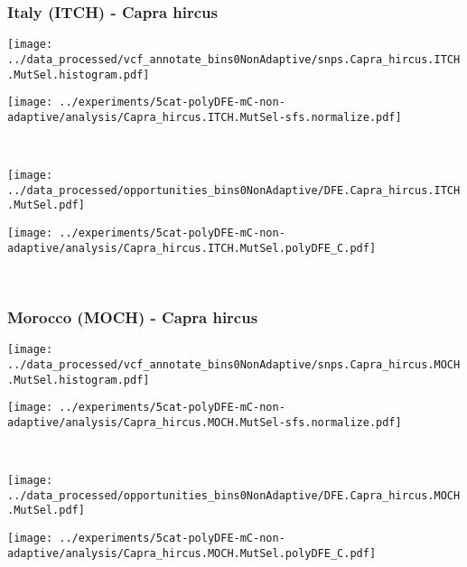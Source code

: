 \subsubsection{Italy (ITCH) - Capra hircus}

\begin{minipage}{0.49\linewidth}
    \texttt{[image: ../data\_processed/vcf\_annotate\_bins0NonAdaptive/snps.Capra\_hircus.ITCH.MutSel.histogram.pdf]}
\end{minipage}
\begin{minipage}{0.49\linewidth}
    \texttt{[image: ../experiments/5cat-polyDFE-mC-non-adaptive/analysis/Capra\_hircus.ITCH.MutSel-sfs.normalize.pdf]}
\end{minipage}
\\
\begin{minipage}{0.49\linewidth}
    \texttt{[image: ../data\_processed/opportunities\_bins0NonAdaptive/DFE.Capra\_hircus.ITCH.MutSel.pdf]}
\end{minipage}
\begin{minipage}{0.49\linewidth}
    \texttt{[image: ../experiments/5cat-polyDFE-mC-non-adaptive/analysis/Capra\_hircus.ITCH.MutSel.polyDFE\_C.pdf]}
\end{minipage}
\\

\subsubsection{Morocco (MOCH) - Capra hircus}

\begin{minipage}{0.49\linewidth}
    \texttt{[image: ../data\_processed/vcf\_annotate\_bins0NonAdaptive/snps.Capra\_hircus.MOCH.MutSel.histogram.pdf]}
\end{minipage}
\begin{minipage}{0.49\linewidth}
    \texttt{[image: ../experiments/5cat-polyDFE-mC-non-adaptive/analysis/Capra\_hircus.MOCH.MutSel-sfs.normalize.pdf]}
\end{minipage}
\\
\begin{minipage}{0.49\linewidth}
    \texttt{[image: ../data\_processed/opportunities\_bins0NonAdaptive/DFE.Capra\_hircus.MOCH.MutSel.pdf]}
\end{minipage}
\begin{minipage}{0.49\linewidth}
    \texttt{[image: ../experiments/5cat-polyDFE-mC-non-adaptive/analysis/Capra\_hircus.MOCH.MutSel.polyDFE\_C.pdf]}
\end{minipage}
\\

